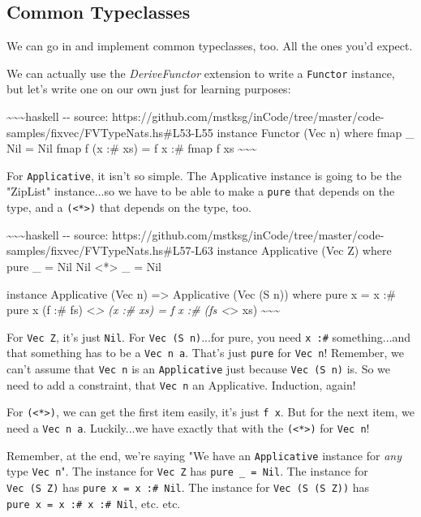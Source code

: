 \documentclass[]{article}
\begin{document}
\subsection{Common Typeclasses}

We can go in and implement common typeclasses, too. All the ones you'd expect.

We can actually use the \emph{DeriveFunctor} extension to write a
\texttt{Functor} instance, but let's write one on our own just for learning
purposes:

\textasciitilde{}\textasciitilde{}\textasciitilde{}haskell -\/- source:
https://github.com/mstksg/inCode/tree/master/code-samples/fixvec/FVTypeNats.hs\#L53-L55
instance Functor (Vec n) where fmap \_ Nil = Nil fmap f (x :\# xs) = f x :\#
fmap f xs \textasciitilde{}\textasciitilde{}\textasciitilde{}

For \texttt{Applicative}, it isn't so simple. The Applicative instance is going
to be the "ZipList" instance...so we have to be able to make a \texttt{pure}
that depends on the type, and a \texttt{(\textless{}*\textgreater{})} that
depends on the type, too.

\textasciitilde{}\textasciitilde{}\textasciitilde{}haskell -\/- source:
https://github.com/mstksg/inCode/tree/master/code-samples/fixvec/FVTypeNats.hs\#L57-L63
instance Applicative (Vec Z) where pure \_ = Nil Nil \textless{}*\textgreater{}
\_ = Nil

instance Applicative (Vec n) =\textgreater{} Applicative (Vec (S n)) where pure
x = x :\# pure x (f :\# fs) \textless{}\emph{\textgreater{} (x :\# xs) = f x :\#
(fs \textless{}}\textgreater{} xs)
\textasciitilde{}\textasciitilde{}\textasciitilde{}

For \texttt{Vec\ Z}, it's just \texttt{Nil}. For \texttt{Vec\ (S\ n)}...for
pure, you need \texttt{x\ :\#} something...and that something has to be a
\texttt{Vec\ n\ a}. That's just \texttt{pure} for \texttt{Vec\ n}! Remember, we
can't assume that \texttt{Vec\ n} is an \texttt{Applicative} just because
\texttt{Vec\ (S\ n)} is. So we need to add a constraint, that \texttt{Vec\ n} an
Applicative. Induction, again!

For \texttt{(\textless{}*\textgreater{})}, we can get the first item easily,
it's just \texttt{f\ x}. But for the next item, we need a \texttt{Vec\ n\ a}.
Luckily...we have exactly that with the \texttt{(\textless{}*\textgreater{})}
for \texttt{Vec\ n}!

Remember, at the end, we're saying "We have an \texttt{Applicative} instance for
\emph{any} type \texttt{Vec\ n}". The instance for \texttt{Vec\ Z} has
\texttt{pure\ \_\ =\ Nil}. The instance for \texttt{Vec\ (S\ Z)} has
\texttt{pure\ x\ =\ x\ :\#\ Nil}. The instance for \texttt{Vec\ (S\ (S\ Z))} has
\texttt{pure\ x\ =\ x\ :\#\ x\ :\#\ Nil}, etc. etc.
\end{document}

